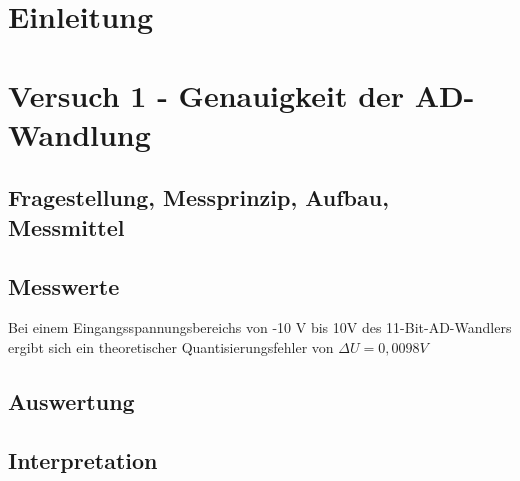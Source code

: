 \documentclass[12pt,oneside,a4paper]{report}
\begin{document}




\clearpage

%
%


%
%


%
%


%
%




\setcounter{page}{1}
%
%
\chapter{Einleitung}
\label{chap:EINL}


%
%
\chapter{Versuch 1 - Genauigkeit der AD-Wandlung}
\label{chap:VERSUCH_1}

\section{Fragestellung, Messprinzip, Aufbau, Messmittel}
\label{chap:VERSUCH_1_FRAGESTELLUNG}

\section{Messwerte}
\label{chap:VERSUCH_1_MESSWERTE}
Bei einem Eingangsspannungsbereichs von -10 V bis 10V des 11-Bit-AD-Wandlers ergibt sich ein theoretischer Quantisierungsfehler von $\Delta U = 0,0098 V$

\section{Auswertung}
\label{chap:VERSUCH_1_AUSWERTUNG}

\section{Interpretation}
\label{chap:VERSUCH_1_INTERPRETATION}
\end{document}
